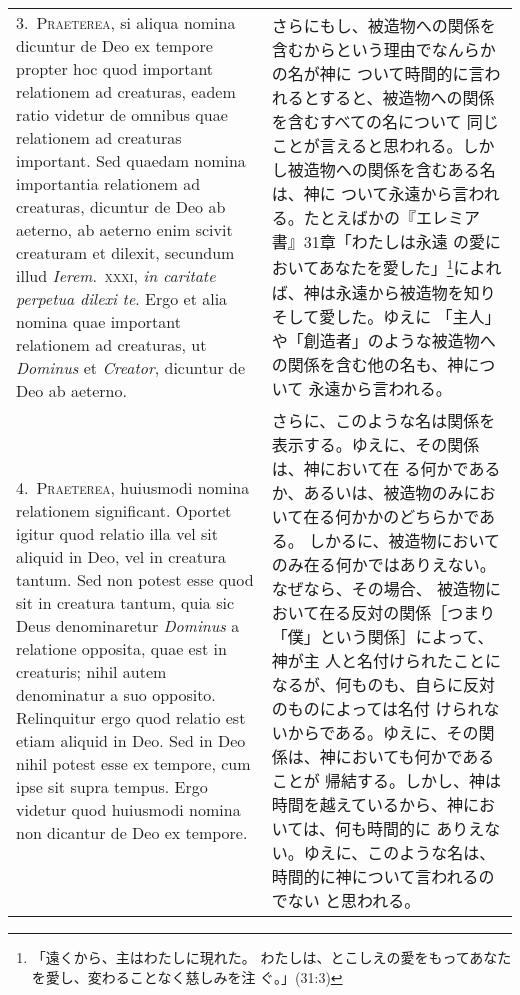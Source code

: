 \documentclass[10pt]{jsarticle} %
\begin{document}
\begin{longtable}{p{21em}p{21em}}
3.~{\scshape Praeterea}, si aliqua nomina dicuntur de Deo ex tempore
propter hoc quod important relationem ad creaturas, eadem ratio
videtur de omnibus quae relationem ad creaturas important. Sed quaedam
nomina importantia relationem ad creaturas, dicuntur de Deo ab
aeterno, ab aeterno enim scivit creaturam et dilexit, secundum illud
{\itshape Ierem}.~{\scshape xxxi}, {\itshape in caritate perpetua
dilexi te}. Ergo et alia nomina quae important relationem ad
creaturas, ut {\itshape Dominus} et {\itshape Creator}, dicuntur de
Deo ab aeterno.


&

さらにもし、被造物への関係を含むからという理由でなんらかの名が神に
ついて時間的に言われるとすると、被造物への関係を含むすべての名について
同じことが言えると思われる。しかし被造物への関係を含むある名は、神に
ついて永遠から言われる。たとえばかの『エレミア書』31章「わたしは永遠
の愛においてあなたを愛した」\footnote{「遠くから、主はわたしに現れた。
わたしは、とこしえの愛をもってあなたを愛し、変わることなく慈しみを注
ぐ。」(31:3)}によれば、神は永遠から被造物を知りそして愛した。ゆえに
「主人」や「創造者」のような被造物への関係を含む他の名も、神について
永遠から言われる。

\\


4.~{\scshape Praeterea}, huiusmodi nomina relationem
significant. Oportet igitur quod relatio illa vel sit aliquid in Deo,
vel in creatura tantum. Sed non potest esse quod sit in creatura
tantum, quia sic Deus denominaretur {\itshape Dominus} a relatione
opposita, quae est in creaturis; nihil autem denominatur a suo
opposito. Relinquitur ergo quod relatio est etiam aliquid in Deo. Sed
in Deo nihil potest esse ex tempore, cum ipse sit supra tempus. Ergo
videtur quod huiusmodi nomina non dicantur de Deo ex tempore.

&

さらに、このような名は関係を表示する。ゆえに、その関係は、神において在
る何かであるか、あるいは、被造物のみにおいて在る何かかのどちらかである。
しかるに、被造物においてのみ在る何かではありえない。なぜなら、その場合、
被造物において在る反対の関係［つまり「僕」という関係］によって、神が主
人と名付けられたことになるが、何ものも、自らに反対のものによっては名付
けられないからである。ゆえに、その関係は、神においても何かであることが
帰結する。しかし、神は時間を越えているから、神においては、何も時間的に
ありえない。ゆえに、このような名は、時間的に神について言われるのでない
と思われる。

\\



\end{longtable}
\end{document}
